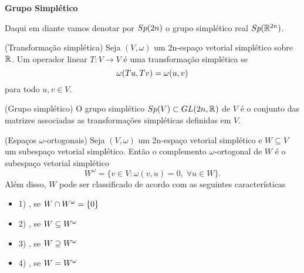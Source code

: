 \documentclass{beamer}
\newcommand{\titulo}[1]{\centering \textbf{#1}}
\begin{document}
\begin{frame}
	\titulo{Grupo Simplético}
	
	Daqui em diante vamos denotar por $Sp(2n)$ o grupo simplético real $Sp(\mathbb{R}^{2n})$.
	
	\begin{definicao}
		(Transformação simplética) Seja $(V, \omega)$ um 2n-espaço vetorial simplético sobre $\mathbb{R}^{}$. Um operador linear $T: V \to V$ é uma transformação simplética se 
		$$
		\omega(Tu, Tv) = \omega(u, v)
		$$ para todo $u,v\in V$.
	\end{definicao}
	
	\begin{definicao}
		(Grupo simplético) O grupo simplético $Sp(V) \subset GL(2n, \mathbb{R}^{})$ de $V$ é o conjunto das matrizes associadas as transformações simpléticas definidas em $V$.
	\end{definicao}	
\end{frame}

\begin{frame}
	\begin{definicao}
		(Espaços $\omega$-ortogonais) Seja $(V, \omega)$ um 2n-espaço vetorial simplético e $W\subseteq V$ um subespaço vetorial simplético. Então o complemento $\omega$-ortogonal de $W$ é o subespaço vetorial simplético
		$$
		W^{\omega} = \{v\in V: \omega(v,u) = 0,\;\forall u\in W \}.
		$$
		Além disso, $W$ pode ser classificado de acordo com as seguintes características
		\begin{itemize}
		\item 1) , se $W\cap W^{\omega} = \{0\}$
			
		\item 2) , se $W \subseteq W^{\omega}$
		
		\item 3) , se $W\supseteq W^{\omega}$
		
		\item 4) , se $W =W^{\omega}$
		\end{itemize}
	\end{definicao}
\end{frame}
\end{document}
